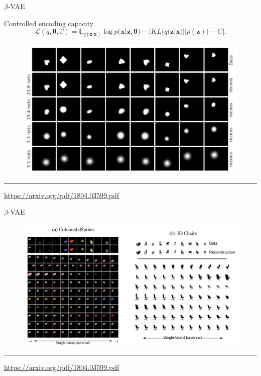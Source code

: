 \documentclass{beamer}
\newcommand{\bx}{\mathbf{x}}
\newcommand{\bz}{\mathbf{z}}
\newcommand{\btheta}{\boldsymbol{\theta}}
\begin{document}
\begin{frame}{$\beta$-VAE}
\begin{block}{Controlled encoding capacity}
\vspace{-0.5cm}
\[
    \mathcal{L}(q, \btheta, \beta) = \mathbb{E}_{q(\bz | \bx)} \log p(\bx | \bz, \btheta) - | KL (q(\bz | \bx) || p(\bz)) - C|.
\]
\end{block}
\begin{figure}
    \centering
    \includegraphics[width=0.8\linewidth]{figs/betaVAE_8.png}
\end{figure}
\vfill
\hrule\medskip
{\scriptsize \href{https://arxiv.org/pdf/1804.03599.pdf}{https://arxiv.org/pdf/1804.03599.pdf}}
\end{frame}
\begin{frame}{$\beta$-VAE}
\begin{figure}
    \centering
    \includegraphics[width=\linewidth]{figs/betaVAE_9.png}
\end{figure}
\vfill
\hrule\medskip
{\scriptsize \href{https://arxiv.org/pdf/1804.03599.pdf}{https://arxiv.org/pdf/1804.03599.pdf}}
\end{frame}
\end{document}
